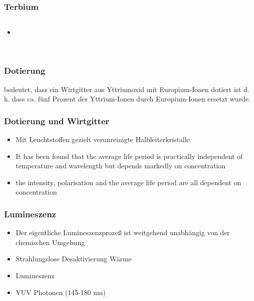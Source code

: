 \documentclass{beamer}
\begin{document}
 \begin{frame}[t]\frametitle{ Terbium  }
 \begin{columns}
    \begin{block}{}
      \begin{itemize}
        \item 
      \end{itemize}
    \end{block}
\begin{block}{}
   \\
   \\
\end{block}
\end{columns}
  \end{frame}


\begin{frame}[t]\frametitle{Dotierung}
 bedeutet, dass ein Wirtgitter aus Yttriumoxid mit Europium-Ionen dotiert ist
 d. h. dass ca. fünf Prozent der Yttrium-Ionen durch Europium-Ionen ersetzt wurde.


\end{frame}


\begin{frame}[t]\frametitle{Dotierung und Wirtgitter}
\begin{itemize}
  \item Mit Leuchtstoffen gezielt verunreinigte Halbleiterkristalle
  \item It has been found that the average life period is practically independent of temperature and wavelength but depends markedly on concentration
  \item the intensity, polarisation and the average life period are all dependent on concentration
\end{itemize}


\end{frame}

  \begin{frame}
  \frametitle{Lumineszenz}
    \begin{itemize}
    \item Der eigentliche Lumineszenzprozeß ist weitgehend unabhängig von der chemischen Umgebung
    \item Strahlungslose Desaktivierung  Wärme
    \item Lumineszenz 
    \item VUV Photonen (145-180 nm)
    \end{itemize}
  \end{frame}
\end{document}
